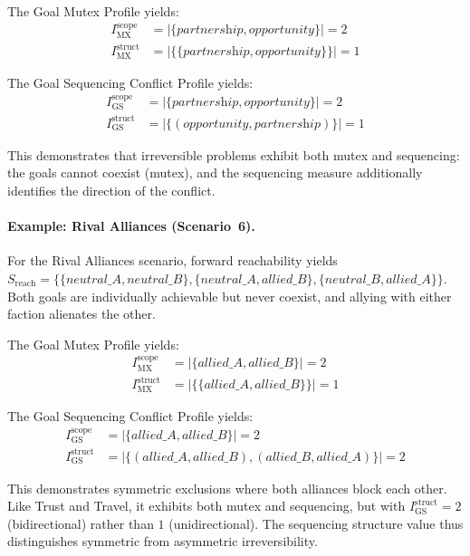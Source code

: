 The Goal Mutex Profile yields:
\begin{align*}
    I^{\text{scope}}_{\text{MX}}  & = |\{\textit{partnership}, \textit{opportunity}\}| = 2     \\
    I^{\text{struct}}_{\text{MX}} & = |\{\{\textit{partnership}, \textit{opportunity}\}\}| = 1
\end{align*}

The Goal Sequencing Conflict Profile yields:
\begin{align*}
    I^{\text{scope}}_{\text{GS}}  & = |\{\textit{partnership}, \textit{opportunity}\}| = 2   \\
    I^{\text{struct}}_{\text{GS}} & = |\{(\textit{opportunity}, \textit{partnership})\}| = 1
\end{align*}

This demonstrates that irreversible problems exhibit both mutex and sequencing: the goals cannot coexist (mutex), and the sequencing measure additionally identifies the direction of the conflict.

\paragraph{Example: Rival Alliances (Scenario~6).} For the Rival Alliances scenario, forward reachability yields $S_{\text{reach}} = \{\{\textit{neutral\_A}, \textit{neutral\_B}\}, \{\textit{neutral\_A}, \textit{allied\_B}\}, \{\textit{neutral\_B}, \textit{allied\_A}\}\}$. Both goals are individually achievable but never coexist, and allying with either faction alienates the other.

The Goal Mutex Profile yields:
\begin{align*}
    I^{\text{scope}}_{\text{MX}}  & = |\{\textit{allied\_A}, \textit{allied\_B}\}| = 2     \\
    I^{\text{struct}}_{\text{MX}} & = |\{\{\textit{allied\_A}, \textit{allied\_B}\}\}| = 1
\end{align*}

The Goal Sequencing Conflict Profile yields:
\begin{align*}
    I^{\text{scope}}_{\text{GS}}  & = |\{\textit{allied\_A}, \textit{allied\_B}\}| = 2                                             \\
    I^{\text{struct}}_{\text{GS}} & = |\{(\textit{allied\_A}, \textit{allied\_B}), (\textit{allied\_B}, \textit{allied\_A})\}| = 2
\end{align*}

This demonstrates symmetric exclusions where both alliances block each other. Like Trust and Travel, it exhibits both mutex and sequencing, but with $I^{\text{struct}}_{\text{GS}} = 2$ (bidirectional) rather than $1$ (unidirectional). The sequencing structure value thus distinguishes symmetric from asymmetric irreversibility.
